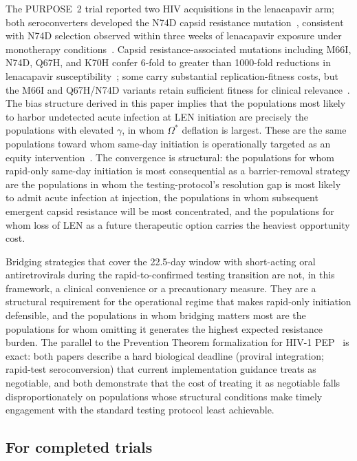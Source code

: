 \documentclass[11pt]{article}
\begin{document}
The PURPOSE~2 trial reported two HIV acquisitions in the lenacapavir arm; both seroconverters developed the N74D capsid resistance mutation~\cite{kelley2025,who_len_2025}, consistent with N74D selection observed within three weeks of lenacapavir exposure under monotherapy conditions~\cite{wirden2024n74d}. Capsid resistance-associated mutations including M66I, N74D, Q67H, and K70H confer 6-fold to greater than 1000-fold reductions in lenacapavir susceptibility~\cite{briganti2025m66i,pennetzdorfer2026}; some carry substantial replication-fitness costs, but the M66I and Q67H/N74D variants retain sufficient fitness for clinical relevance~\cite{pennetzdorfer2026}. The bias structure derived in this paper implies that the populations most likely to harbor undetected acute infection at LEN initiation are precisely the populations with elevated $\gamma$, in whom $\Omega^*$ deflation is largest. These are the same populations toward whom same-day initiation is operationally targeted as an equity intervention~\cite{tanner2025pep}. The convergence is structural: the populations for whom rapid-only same-day initiation is most consequential as a barrier-removal strategy are the populations in whom the testing-protocol's resolution gap is most likely to admit acute infection at injection, the populations in whom subsequent emergent capsid resistance will be most concentrated, and the populations for whom loss of LEN as a future therapeutic option carries the heaviest opportunity cost.

Bridging strategies that cover the 22.5-day window with short-acting oral antiretrovirals during the rapid-to-confirmed testing transition are not, in this framework, a clinical convenience or a precautionary measure. They are a structural requirement for the operational regime that makes rapid-only initiation defensible, and the populations in whom bridging matters most are the populations for whom omitting it generates the highest expected resistance burden. The parallel to the Prevention Theorem formalization for HIV-1 PEP~\cite{demidont2026fw} is exact: both papers describe a hard biological deadline (proviral integration; rapid-test seroconversion) that current implementation guidance treats as negotiable, and both demonstrate that the cost of treating it as negotiable falls disproportionately on populations whose structural conditions make timely engagement with the standard testing protocol least achievable.

\subsection{For completed trials}
\end{document}
